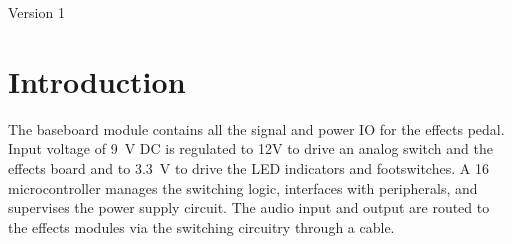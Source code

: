 \documentclass[12pt, titlepage]{tex-template}
\begin{document}
\maketitle

\pagebreak
\tableofcontents
\pagebreak

\blankpage

\pagebreak
\begin{revisionhistory}
    Version 1
\end{revisionhistory}
\pagebreak

\blankpage

\pagebreak

\section{Introduction}
The baseboard module contains all the signal and power IO for the effects pedal. Input voltage of \SI{9}{\volt} DC is regulated to 12V to drive an analog switch and the effects board and to \SI{3.3}{\volt} to drive the LED indicators and footswitches. A \SI{16}{\bit} microcontroller manages the switching logic, interfaces with peripherals, and supervises the power supply circuit. The audio input and output are routed to the effects modules via the switching circuitry through a cable.
\end{document}

